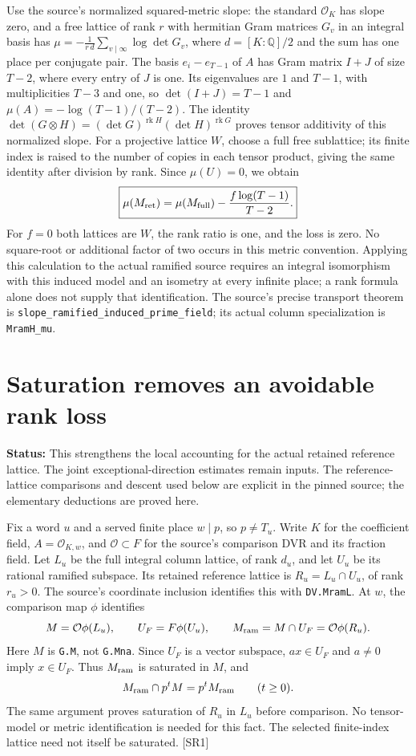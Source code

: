 \documentclass[11pt,a4paper]{article}
\numberwithin{equation}{section}
\theoremstyle{remark}\newtheorem{remark}[theorem]{Remark}
\newcommand{\status}[1]{\textbf{Status:} #1}
\begin{document}
Use the source's normalized squared-metric slope: the standard
$\mathcal O_K$ has slope zero, and a free lattice of rank $r$ with
hermitian Gram matrices $G_v$ in an integral basis has
$\mu=-\frac1{r\,d}\sum_{v\mid\infty}\log\det G_v$, where
$d=[K:\mathbb Q]/2$ and the sum has one place per conjugate pair.
The basis $e_i-e_{T-1}$ of $A$ has Gram matrix $I+J$ of size $T-2$,
where every entry of $J$ is one.  Its eigenvalues are $1$ and $T-1$,
with multiplicities $T-3$ and one, so $\det(I+J)=T-1$ and
$\mu(A)=-\log(T-1)/(T-2)$.
The identity
$\det(G\otimes H)=(\det G)^{\operatorname{rk}H}
 (\det H)^{\operatorname{rk}G}$ proves tensor additivity of this
normalized slope.  For a projective lattice $W$, choose a full free
sublattice; its finite index is raised to the number of copies in each
tensor product, giving the same identity after division by rank.
Since $\mu(U)=0$, we obtain
\[
 \boxed{\displaystyle
 \mu(M_{\rm ret})=\mu(M_{\rm full})
       -\frac{f\log(T-1)}{T-2}.}
\]
For $f=0$ both lattices are $W$, the rank ratio is one, and the loss is
zero.  No square-root or additional factor of two occurs in this metric
convention.  Applying this calculation to the actual ramified source
requires an integral isomorphism with this induced model and an isometry
at every infinite place; a rank formula alone does not supply that
identification.  The source's precise transport theorem is
\texttt{slope\_ramified\_induced\_prime\_field}; its actual column
specialization is \texttt{MramH\_mu}.


\section{Saturation removes an avoidable rank loss}\label{sec:saturation}

\status{This strengthens the local accounting for the actual retained reference lattice. The joint exceptional-direction estimates remain inputs. The reference-lattice comparisons and descent used below are explicit in the pinned source; the elementary deductions are proved here.}

Fix a word $u$ and a served finite place $w\mid p$, so $p\ne T_u$.
Write $K$ for the coefficient field, $A=\mathcal O_{K,w}$, and
$\mathcal O\subset F$ for the source's comparison DVR and its fraction field.
Let $L_u$ be the full integral column lattice, of rank $d_u$, and let
$U_u$ be its rational ramified subspace. Its retained reference lattice is
$R_u=L_u\cap U_u$, of rank $r_u>0$.
The source's coordinate inclusion identifies this with \texttt{DV.MramL}.
At $w$, the comparison map $\phi$ identifies
\begin{equation}\label{eq:sr-reference}
 M=\mathcal O\phi(L_u),\qquad
 U_F=F\phi(U_u),\qquad
 M_{\rm ram}=M\cap U_F=\mathcal O\phi(R_u).
\end{equation}
Here $M$ is \texttt{G.M}, not \texttt{G.Mna}. Since $U_F$ is a vector
subspace, $ax\in U_F$ and $a\ne0$ imply $x\in U_F$. Thus
$M_{\rm ram}$ is saturated in $M$, and
\[
 M_{\rm ram}\cap p^tM=p^tM_{\rm ram}\qquad(t\ge0).
\]
The same argument proves saturation of $R_u$ in $L_u$ before comparison.
No tensor-model or metric identification is needed for this fact.
The selected finite-index lattice need not itself be saturated. \textsf{[SR1]}
\end{document}

